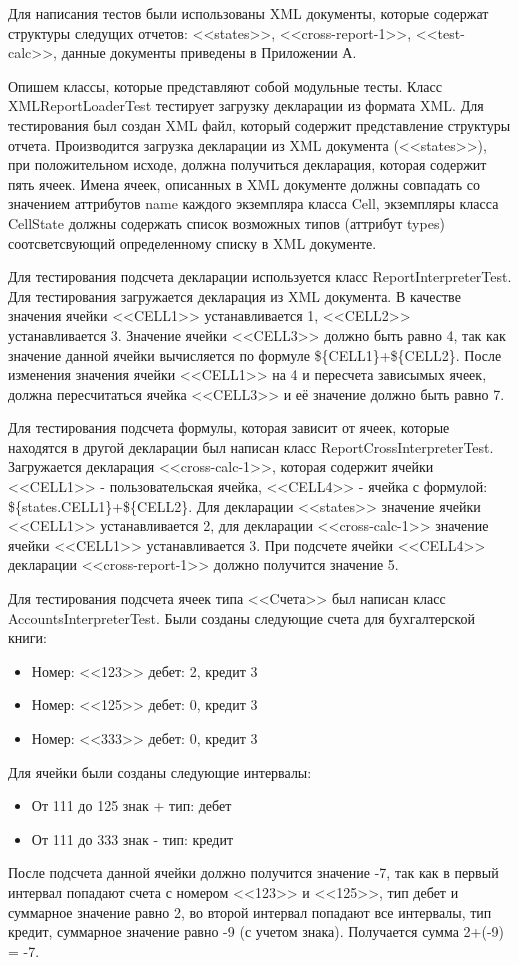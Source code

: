 \documentclass[14pt,a4paper]{reportmod}
\begin{document}
Для написания тестов были использованы XML документы, которые содержат структуры следущих отчетов: <<states>>, <<cross-report-1>>, <<test-calc>>, данные документы приведены в Приложении А.

Опишем классы, которые представляют собой модульные тесты. Класс XMLReportLoaderTest тестирует загрузку декларации из формата XML. Для тестирования был создан XML файл, который содержит представление структуры отчета. Производится загрузка декларации из XML документа (<<states>>), при положительном исходе, должна получиться декларация, которая содержит пять ячеек. Имена ячеек, описанных в XML документе должны совпадать со значением аттрибутов name каждого экземпляра класса Cell, экземпляры класса CellState должны содержать список возможных типов (аттрибут types) соотсветсвующий определенному списку в XML документе.


Для тестирования подсчета декларации используется класс ReportInterpreterTest. Для тестирования загружается декларация из XML документа. В качестве значения ячейки <<CELL1>> устанавливается 1,  <<CELL2>> устанавливается 3. Значение ячейки <<CELL3>> должно быть равно 4, так как значение данной ячейки вычисляется по формуле \$\{CELL1\}+\$\{CELL2\}. После изменения значения ячейки <<CELL1>> на 4 и пересчета зависымых ячеек, должна пересчитаться ячейка <<CELL3>> и её значение должно быть равно 7.


Для тестирования подсчета формулы, которая зависит от ячеек, которые находятся в другой декларации был написан класс ReportCrossInterpreterTest. Загружается декларация <<cross-calc-1>>, которая содержит ячейки <<CELL1>> - пользовательская ячейка, <<CELL4>> - ячейка с формулой: \mbox{\$\{states.CELL1\}+\$\{CELL2\}}. Для декларации <<states>> значение ячейки <<CELL1>> устанавливается 2, для декларации <<cross-calc-1>> значение ячейки <<CELL1>> устанавливается 3. При подсчете ячейки <<CELL4>> декларации <<cross-report-1>> должно получится значение 5.


Для тестирования подсчета ячеек типа <<Cчета>> был написан класс AccountsInterpreterTest. Были созданы следующие счета для бухгалтерской книги:
\begin{itemize}
  \item Номер: <<123>> дебет: 2, кредит 3
  \item Номер: <<125>> дебет: 0, кредит 3
  \item Номер: <<333>> дебет: 0, кредит 3
\end{itemize}
Для ячейки были созданы следующие интервалы:
\begin{itemize}
  \item От 111 до 125 знак + тип: дебет
  \item От 111 до 333 знак - тип: кредит
\end{itemize}
После подсчета данной ячейки должно получится значение -7, так как в первый интервал попадают счета с номером <<123>> и <<125>>, тип дебет и суммарное значение равно 2, во второй интервал попадают все интервалы, тип кредит, суммарное значение равно -9 (с учетом знака). Получается сумма 2+(-9) = -7.
\end{document}
